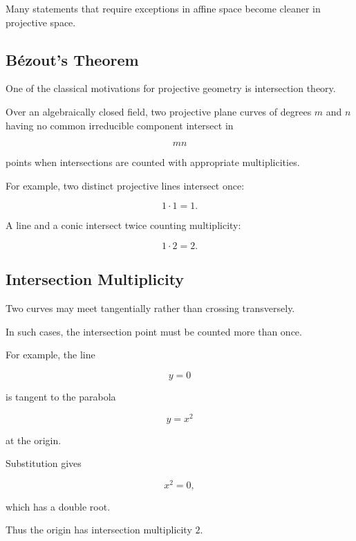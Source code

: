 Many statements that require exceptions in affine space become cleaner in
projective space.

\subsection{B\'ezout's Theorem}
\label{subsec:bezout-theorem}

One of the classical motivations for projective geometry is intersection
theory.

\begin{theorem}
Over an algebraically closed field, two projective plane curves of degrees
\(m\) and \(n\) having no common irreducible component intersect in

\[
\boxed{mn}
\]

points when intersections are counted with appropriate multiplicities.
\end{theorem}

For example, two distinct projective lines intersect once:

\[
1\cdot1=1.
\]

A line and a conic intersect twice counting multiplicity:

\[
1\cdot2=2.
\]

\subsection{Intersection Multiplicity}
\label{subsec:intersection-multiplicity}

Two curves may meet tangentially rather than crossing transversely.

In such cases, the intersection point must be counted more than once.

For example, the line

\[
y=0
\]

is tangent to the parabola

\[
y=x^2
\]

at the origin.

Substitution gives

\[
x^2=0,
\]

which has a double root.

Thus the origin has intersection multiplicity \(2\).

